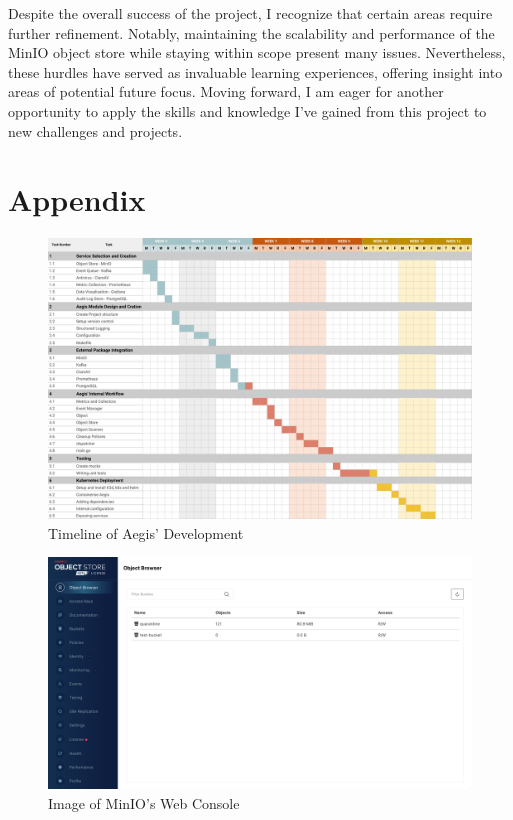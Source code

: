 \documentclass[12pt, conference, final, a4paper, onecolumn, compsoc]{IEEEtran}
\begin{document}
Despite the overall success of the project, I recognize that certain areas
require further refinement. Notably, maintaining the scalability and performance
of the MinIO object store while staying within scope present many issues.
Nevertheless, these hurdles have served as invaluable learning experiences,
offering insight into areas of potential future focus. Moving forward, I am
eager for another opportunity to apply the skills and knowledge I've gained from
this project to new challenges and projects.
\section{Appendix}

\begin{figure}[H]
  \centering \includegraphics[scale=.67]{diagrams/gantt-chart.png}
  \caption{Timeline of Aegis' Development}
  \label{appendix:gantt}
\end{figure}

\begin{figure}[H]
  \centering \includegraphics[scale=.3]{images/minio-console.png}
  \caption{Image of MinIO's Web Console}
  \label{appendix:minio-console}
\end{figure}
\end{document}
